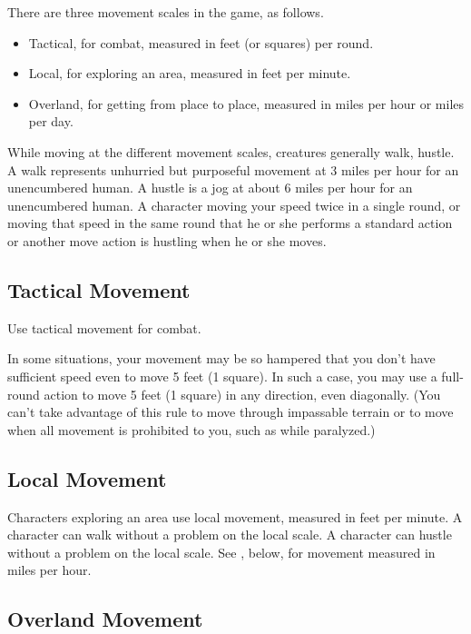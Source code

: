 There are three movement scales in the game, as follows.
\begin{itemize}
\item Tactical, for combat, measured in feet (or squares) per round.
\item Local, for exploring an area, measured in feet per minute.
\item Overland, for getting from place to place, measured in miles per
hour or miles per day.
\end{itemize}

 While moving at the different movement scales, creatures generally walk, hustle.
 A walk represents unhurried but purposeful movement at 3 miles per hour for an unencumbered human.
 A hustle is a jog at about 6 miles per hour for an unencumbered human. A character moving your
speed twice in a single round, or moving that speed in the same round that he or she performs a standard action or another move action is hustling when he or she moves.

\subsection{Tactical Movement}
Use tactical movement for combat.

 In some situations, your movement may be so hampered that you don't have sufficient speed even to move 5 feet (1 square). In such a case, you may use a full-round action to move 5 feet (1 square) in any direction, even diagonally. (You can't take advantage of this rule to move through impassable terrain or to move when all movement is prohibited to you, such as while paralyzed.)

\subsection{Local Movement}
Characters exploring an area use local movement, measured in feet per minute.
 A character can walk without a problem on the local scale.
 A character can hustle without a problem on the local scale. See , below, for movement measured in miles per hour.

\subsection{Overland Movement}

